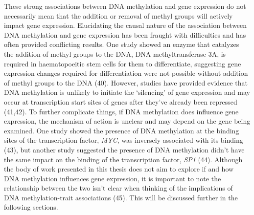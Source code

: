 \documentclass[11pt,oneside]{bristolthesis}
\begin{document}
These strong associations between DNA methylation and gene expression do not necessarily mean that the addition or removal of methyl groups will actively impact gene expression. Elucidating the causal nature of the association between DNA methylation and gene expression has been fraught with difficulties and has often provided conflicting results. One study showed an enzyme that catalyzes the addition of methyl groups to the DNA, DNA methyltransferase 3A, is required in haematopoeitic stem cells for them to differentiate, suggesting gene expression changes required for differentiation were not possible without addition of methyl groups to the DNA (40). However, studies have provided evidence that DNA methylation is unlikely to initiate the `silencing' of gene expression and may occur at transcription start sites of genes after they've already been repressed (41,42). To further complicate things, if DNA methylation does influence gene expression, the mechanism of action is unclear and may depend on the gene being examined. One study showed the presence of DNA methylation at the binding sites of the transcription factor, \emph{MYC}, was inversely associated with its binding (43), but another study suggested the presence of DNA methylation didn't have the same impact on the binding of the transcription factor, \emph{SP1} (44). Although the body of work presented in this thesis does not aim to explore if and how DNA methylation influences gene expression, it is important to note the relationship between the two isn't clear when thinking of the implications of DNA methylation-trait associations (45). This will be discussed further in the following sections.
\end{document}
